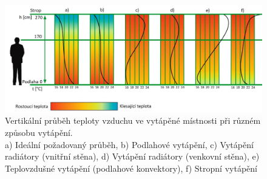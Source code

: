 \begin{figure}[h]
  \includegraphics[width=\linewidth]{images/vertikalni-prubehy-teplot-pro-ruzne-druhy-vytapeni.png}
  \caption{Vertikální průběh teploty vzduchu ve vytápěné místnosti při různém způsobu vytápění. \cite{vertikalni-prubehy-teplot-pro-ruzne-druhy-vytapeni} \\ a) Ideální požadovaný průběh, b) Podlahové vytápění, c) Vytápění radiátory (vnitřní stěna), d) Vytápění radiátory (venkovní stěna), e) Teplovzdušné vytápění (podlahové konvektory), f) Stropní vytápění }
  \label{fig:vertikalni-prubehy-teplot-pro-ruzne-druhy-vytapeni}
\end{figure}

